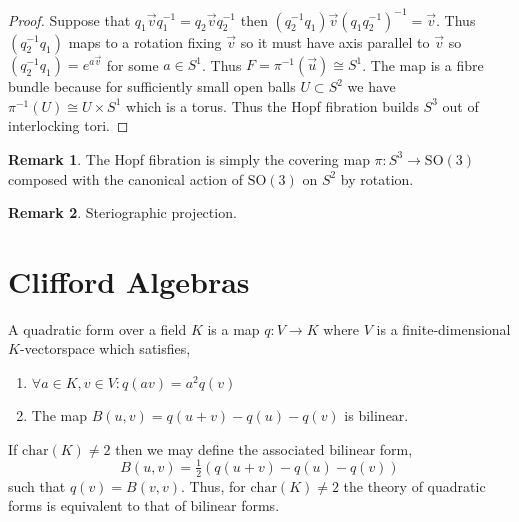 \documentclass[12pt]{extarticle}
\theoremstyle{definition}
\newtheorem{remark}{Remark}
\newenvironment{definition}[1][Definition:]{\begin{trivlist}
\item[\hskip \labelsep {\bfseries #1}]}{\end{trivlist}}
\newcommand{\SO}[1]{\mathrm{SO}\left(#1\right)}
\newcommand{\fchar}[1]{\mathrm{char}(#1)}
\begin{document}
\begin{proof}
Suppose that $q_1 \vec{v} q_1^{-1} = q_2 \vec{v} q_2^{-1}$ then $(q_2^{-1} q_1) \vec{v} (q_1 q_2^{-1})^{-1} = \vec{v}$. Thus $(q_2^{-1} q_1)$ maps to a rotation fixing $\vec{v}$ so it must have axis parallel to $\vec{v}$ so $(q_2^{-1} q_1) = e^{a \vec{v}}$ for some $a \in S^1$. Thus $F = \pi^{-1}(\vec{u}) \cong S^1$. The map is a fibre bundle because for sufficiently small open balls $U \subset S^2$ we have $\pi^{-1}(U) \cong U \times S^1$ which is a torus. Thus the Hopf fibration builds $S^3$ out of interlocking tori.
\end{proof}

\begin{remark}
The Hopf fibration is simply the covering map $\pi : S^3 \to \SO{3}$ composed with the canonical action of $\SO{3}$ on $S^2$ by rotation. 
\end{remark}

\begin{remark}
Steriographic projection.
\end{remark}

\section{Clifford Algebras}


\begin{definition}
A quadratic form over a field $K$ is a map $q : V \to K$ where $V$ is a finite-dimensional $K$-vectorspace which satisfies,
\begin{enumerate}
\item $\forall a \in K, v \in V : q(a v) = a^2 q(v)$

\item The map $B(u,v) = q(u + v) - q(u) - q(v)$ is bilinear.
\end{enumerate}
If $\fchar{K} \neq 2$ then we may define the associated bilinear form,
\[ B(u,v) = \tfrac{1}{2} (q(u + v) - q(u) - q(v)) \]
such that $q(v) = B(v, v)$. Thus, for $\fchar{K} \neq 2$ the theory of quadratic forms is equivalent to that of bilinear forms. 
\end{definition}
\end{document}
